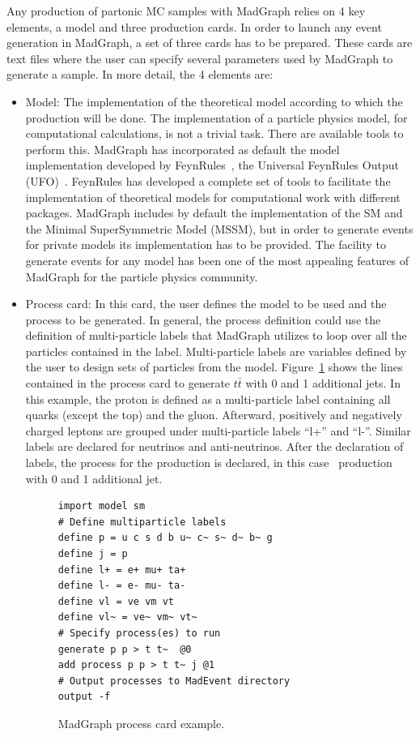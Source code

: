 Any production of partonic MC samples with MadGraph relies on 4 key elements, a model and three production cards. In order to launch any event generation in MadGraph, a set of three cards has to be prepared. These cards are text files where the user can specify several parameters used by MadGraph to generate a sample. In more detail, the 4 elements are:
\begin{itemize}
\item Model: The implementation of the theoretical model according to which the production will be done. The implementation of a particle physics model, for computational calculations, is not a trivial task. There are available tools to perform this. MadGraph has incorporated as default the model implementation developed by FeynRules~\cite{Alloul:2013bka}, the Universal FeynRules Output (UFO)~\cite{Degrande:2011ua}. FeynRules has developed a complete set of tools to facilitate the implementation of theoretical models for computational work with different packages. MadGraph includes by default the implementation of the SM and the Minimal SuperSymmetric Model (MSSM), but in order to generate events for private models its implementation has to be provided. The facility to generate events for any model has been one of the most appealing features of MadGraph for the particle physics community.
\item Process card: In this card, the user defines the model to be used and the process to be generated. In general, the process definition could use the definition of multi-particle labels that MadGraph utilizes to loop over all the particles contained in the label. Multi-particle labels are variables defined by the user to design sets of particles from the model. Figure~\ref{fig:ProcCard} shows the lines contained in the process card to generate $t\bar{t}$ with 0 and 1 additional jets. In this example, the proton is defined as a multi-particle label containing all quarks (except the top) and the gluon. Afterward, positively and negatively charged leptons are grouped under multi-particle labels ``l+'' and ``l-''. Similar labels are declared for neutrinos and anti-neutrinos. After the declaration of labels, the process for the production is declared, in this case \ttbar~production with 0 and 1 additional jet.
  \begin{figure}[!Hhtbp]
    \begin{center}
      \begin{minipage}[c]{0.45\textwidth}
\begin{verbatim}
import model sm
# Define multiparticle labels
define p = u c s d b u~ c~ s~ d~ b~ g
define j = p
define l+ = e+ mu+ ta+
define l- = e- mu- ta-
define vl = ve vm vt
define vl~ = ve~ vm~ vt~
# Specify process(es) to run
generate p p > t t~  @0
add process p p > t t~ j @1
# Output processes to MadEvent directory
output -f
\end{verbatim}
        \end{minipage}
          \caption{MadGraph process card example.}
          \label{fig:ProcCard}
      \end{center}
    \end{figure}
    

\end{itemize}
